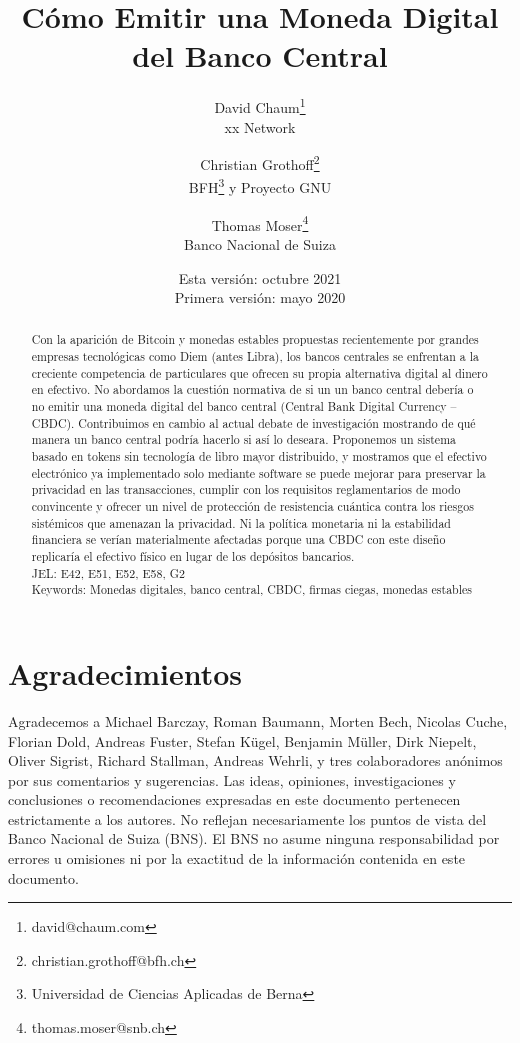 \documentclass[a4paper,10pt]{article} %
\title{Cómo Emitir una Moneda Digital del Banco Central}
\author{David Chaum\footnote{david@chaum.com} \\
  xx Network \and
  Christian Grothoff\footnote{christian.grothoff@bfh.ch} \\
  BFH\footnote{Universidad de Ciencias Aplicadas de Berna}
  \quad y Proyecto GNU \and
  Thomas Moser\footnote{thomas.moser@snb.ch}\\
  Banco Nacional de Suiza}
\date{Esta versión: octubre 2021 \\
      Primera versión: mayo 2020}
\begin{document}
\maketitle

\begin{abstract}
Con la aparición de Bitcoin y monedas estables propuestas recientemente
por grandes empresas tecnológicas como Diem (antes Libra), los bancos
centrales se enfrentan a la creciente competencia de particulares que
ofrecen su propia alternativa digital al dinero en efectivo. No
abordamos la cuestión normativa de si un un banco central debería o no
emitir una moneda digital del banco central (Central Bank Digital
Currency -- CBDC). Contribuimos en cambio al actual debate de
investigación mostrando de qué manera un banco central podría hacerlo si
así lo deseara. Proponemos un sistema basado en tokens sin tecnología de
libro mayor distribuido, y mostramos que el efectivo electrónico ya
implementado solo mediante software se puede mejorar para preservar la
privacidad en las transacciones, cumplir con los requisitos
reglamentarios de modo convincente y ofrecer un nivel de protección de
resistencia cuántica contra los riesgos sistémicos que amenazan la
privacidad. Ni la política monetaria ni la estabilidad financiera se
verían materialmente afectadas porque una CBDC con este diseño
replicaría el efectivo físico en lugar de los depósitos bancarios. \\
JEL: E42, E51, E52, E58, G2
\\
Keywords: Monedas digitales, banco central, CBDC, firmas ciegas, monedas
estables
\end{abstract}

\vspace{40pt}

\section*{Agradecimientos}
Agradecemos a Michael Barczay, Roman Baumann, Morten Bech, Nicolas Cuche,
Florian Dold, Andreas Fuster, Stefan Kügel, Benjamin Müller, Dirk Niepelt,
Oliver Sigrist, Richard Stallman, Andreas Wehrli, y tres colaboradores
anónimos por sus comentarios y sugerencias. Las ideas, opiniones,
investigaciones y conclusiones o recomendaciones expresadas en este
documento pertenecen estrictamente a los autores. No reflejan
necesariamente los puntos de vista del Banco Nacional de Suiza (BNS). El
BNS no asume ninguna responsabilidad por errores u omisiones ni por la
exactitud de la información contenida en este documento.
\end{document}
